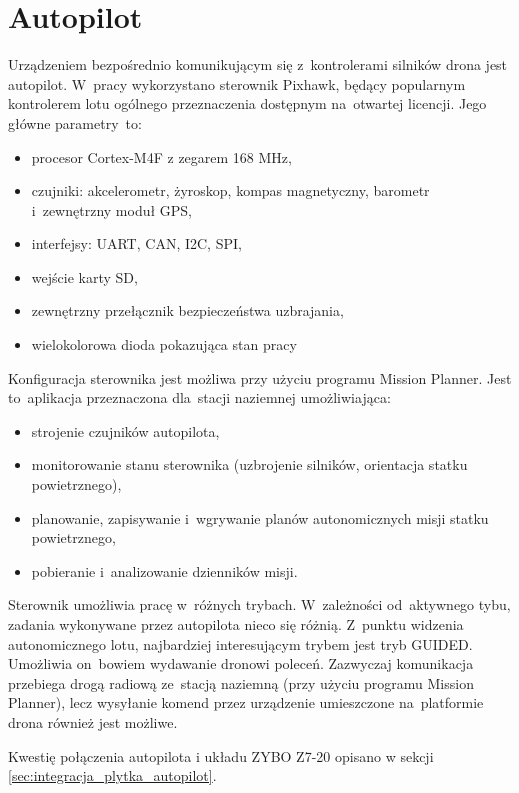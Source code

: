 \section{Autopilot}
\label{sec:autopilot}
Urządzeniem bezpośrednio komunikującym się z~kontrolerami silników drona jest autopilot. W~pracy wykorzystano sterownik Pixhawk, będący popularnym kontrolerem lotu ogólnego przeznaczenia dostępnym na~otwartej licencji.
Jego główne parametry~to:
\begin{itemize}
	\item procesor Cortex-M4F z zegarem 168 MHz,
	\item czujniki: akcelerometr, żyroskop, kompas magnetyczny, barometr i~zewnętrzny moduł GPS,
	\item interfejsy: UART, CAN, I2C, SPI,
	\item wejście karty SD,
	\item zewnętrzny przełącznik bezpieczeństwa uzbrajania,
	\item wielokolorowa dioda pokazująca stan pracy
\end{itemize}
Konfiguracja sterownika jest możliwa przy użyciu programu Mission Planner. Jest to~aplikacja przeznaczona dla~stacji naziemnej umożliwiająca:
\begin{itemize}
	\item strojenie czujników autopilota,
	\item monitorowanie stanu sterownika (uzbrojenie silników, orientacja statku powietrznego),
	\item planowanie, zapisywanie i~wgrywanie planów autonomicznych misji statku powietrznego,
	\item pobieranie i~analizowanie dzienników misji.
\end{itemize}
Sterownik umożliwia pracę w~różnych trybach.
W~zależności od~aktywnego tybu, zadania wykonywane przez autopilota nieco się różnią. Z~punktu widzenia autonomicznego lotu, najbardziej interesującym trybem jest tryb GUIDED. Umożliwia on~bowiem wydawanie dronowi poleceń. Zazwyczaj komunikacja przebiega drogą radiową ze~stacją naziemną (przy użyciu programu Mission Planner), lecz wysyłanie komend przez urządzenie umieszczone na~platformie drona również jest możliwe.

Kwestię połączenia autopilota i układu ZYBO Z7-20 opisano w sekcji \ref{sec:integracja_plytka_autopilot}.